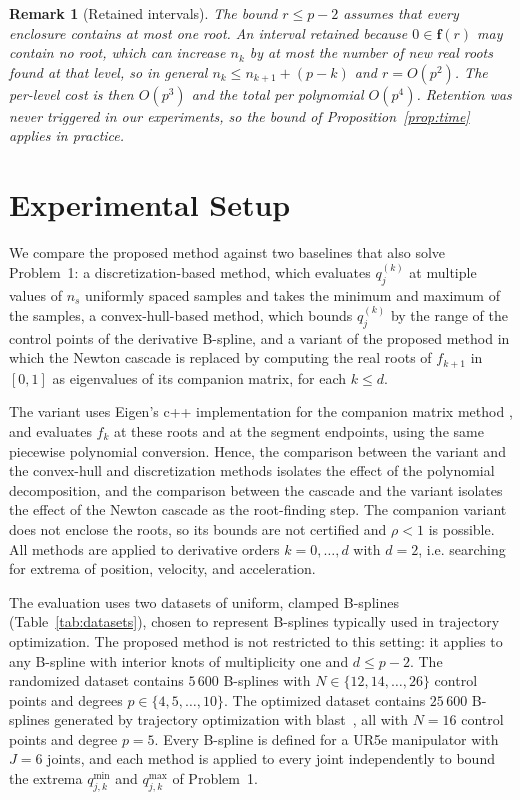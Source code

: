 \documentclass[final,5p,times,twocolumn]{elsarticle}
\newtheorem{remark}{Remark}
\theoremstyle{definition}
\newcommand{\iv}[1]{\mathbf{#1}}
\begin{document}
\begin{remark}[Retained intervals]
The bound $r\le p-2$ assumes that every enclosure contains at most one root. An interval retained because $0\in\iv{f}(r)$ may contain no root, which can increase $n_k$ by at most the number of new real roots found at that level, so in general $n_k\le n_{k+1}+(p-k)$ and $r=O(p^2)$. The per-level cost is then $O(p^3)$ and the total per polynomial $O(p^4)$. Retention was never triggered in our experiments, so the bound of Proposition~\ref{prop:time} applies in practice.
\end{remark}


\section{Experimental Setup} \label{sec:experimental_setup}
We compare the proposed method against two baselines that also solve Problem~1: a discretization-based method, which evaluates $q_j^{(k)}$ at multiple values of $n_s$ uniformly spaced samples and takes the minimum and maximum of the samples, a convex-hull-based method, which bounds $q_j^{(k)}$ by the range of the control points of the derivative B-spline, and a variant of the proposed method in which the Newton cascade is replaced by computing the real roots of $f_{k+1}$ in $[0,1]$ as eigenvalues of its companion matrix, for each $k\le d$. 

The variant uses Eigen's c++ implementation for the companion matrix method \cite{edelman1995polynomial, eigenweb}, and evaluates $f_k$ at these roots and at the segment endpoints, using the same piecewise polynomial conversion. Hence, the comparison between the variant and the convex-hull and discretization methods isolates the effect of the polynomial decomposition, and the comparison between the cascade and the variant isolates the effect of the Newton cascade as the root-finding step. The companion variant does not enclose the roots, so its bounds are not certified and $\rho<1$ is possible. All methods are applied to derivative orders $k=0,\dots,d$ with $d=2$, i.e. searching for extrema of position, velocity, and acceleration.

The evaluation uses two datasets of uniform, clamped B-splines (Table~\ref{tab:datasets}), chosen to represent B-splines typically used in trajectory optimization. The proposed method is not restricted to this setting: it applies to any B-spline with interior knots of multiplicity one and $d\le p-2$. The randomized dataset contains $5\,600$ B-splines with $N\in\{12,14,\dots,26\}$ control points and degrees $p\in\{4,5,\dots,10\}$. The optimized dataset contains $25\,600$ B-splines generated by trajectory optimization with blast~\cite{doiron2026accelerating}, all with $N=16$ control points and degree $p=5$. Every B-spline is defined for a UR5e manipulator with $J=6$ joints, and each method is applied to every joint independently to bound the extrema $q_{j,k}^{\min}$ and $q_{j,k}^{\max}$ of Problem~1. 
\end{document}

